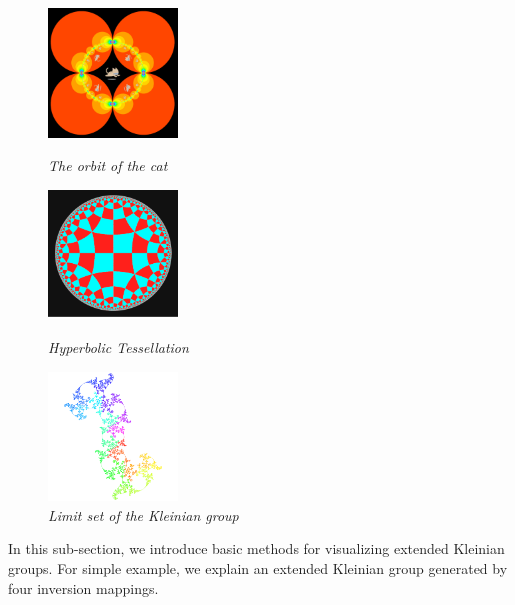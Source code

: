 \begin{figure}[htbp]
 \begin{minipage}[t]{0.3333\hsize}
  \center
  \includegraphics[height=1.35in, keepaspectratio]{img/preparation/basic/catCircleOrbit.png}
  \caption{\textit{The orbit of the cat}}
  \label{fig:orbitCat}
  \hspace*{\fill}
 \end{minipage}
 \begin{minipage}[t]{0.3333\hsize}
  \center
  \includegraphics[height=1.35in, keepaspectratio]{img/preparation/basic/hyperbolicTessellation.png}
  \caption{\textit{Hyperbolic Tessellation}}
  \label{fig:hypTiling}
  \hspace*{\fill}
 \end{minipage}
 \begin{minipage}[t]{0.3333\hsize}
  \center
  \includegraphics[height=1.35in, keepaspectratio]{img/preparation/limitSet/limit.png}
  \caption{\textit{Limit set of the Kleinian group}}
  \label{fig:limit}
  \hspace*{\fill}
 \end{minipage}
\end{figure}

\noindent In this sub-section, we introduce basic methods for
visualizing extended Kleinian groups.
For simple example, we explain an extended Kleinian group generated by
four inversion mappings.


